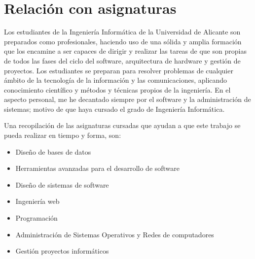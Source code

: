 \section{Relación con asignaturas}
Los estudiantes de la Ingeniería Informática de la Universidad de Alicante son preparados como profesionales, haciendo uso de una sólida y amplia formación que los encamine a ser capaces de dirigir y realizar las tareas de que son propias de todos las fases del ciclo del software, arquitectura de hardware y gestión de proyectos. Los estudiantes se preparan para resolver problemas de cualquier ámbito de la tecnología de la información y las comunicaciones, aplicando conocimiento científico y métodos y técnicas propios de la ingeniería.
En el aspecto personal, me he decantado siempre por el software y la administración de sistemas; motivo de que haya cursado el grado de Ingeniería Informática.
\vspace{1em}
\par Una recopilación de las asignaturas cursadas que ayudan a que este trabajo se pueda realizar en tiempo y forma, son:
\begin{itemize}
    \item Diseño de bases de datos
    \item Herramientas avanzadas para el desarrollo de software
    \item Diseño de sistemas de software
    \item Ingeniería web
    \item Programación
    \item Administración de Sistemas Operativos y Redes de computadores
    \item Gestión proyectos informáticos
\end{itemize}

